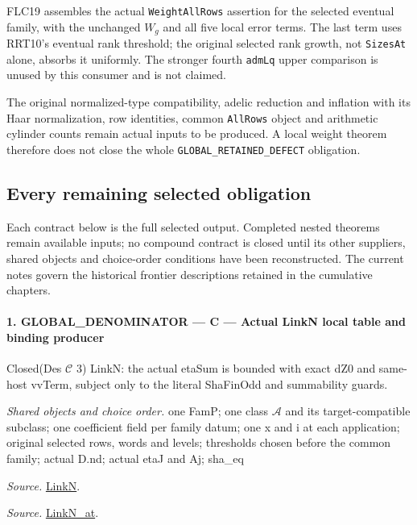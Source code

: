 FLC19 assembles the actual \texttt{Weight\allowbreak All\allowbreak Rows} assertion for the
selected eventual family, with the unchanged $W_g$ and all five local
error terms. The last term uses RRT10's eventual rank threshold;
the original selected rank growth, not \texttt{Sizes\allowbreak At} alone,
absorbs it uniformly. The stronger fourth \texttt{adm\allowbreak Lq} upper
comparison is unused by this consumer and is not claimed.

The original normalized-type compatibility, adelic reduction and
inflation with its Haar normalization, row identities, common
\texttt{All\allowbreak Rows} object and arithmetic cylinder counts remain actual
inputs to be produced. A local weight theorem therefore does not close
the whole \texttt{GLOBAL\_\allowbreak RETAINED\_\allowbreak DEFECT} obligation.

\subsection{Every remaining selected obligation}

Each contract below is the full selected output. Completed nested
theorems remain available inputs; no compound contract is closed until
its other suppliers, shared objects and choice-order conditions have
been reconstructed. The current notes govern the historical frontier
descriptions retained in the cumulative chapters.
\paragraph{1. GLOBAL\_\allowbreak DENOMINATOR — C — Actual LinkN local table and binding producer}

Closed(Des $\mathcal C$ 3) LinkN: the actual etaSum is bounded with exact dZ0 and same-host vvTerm, subject only to the literal ShaFinOdd and summability guards.

\emph{Shared objects and choice order.} one FamP; one class $\mathcal A$ and its target-compatible subclass; one coefficient field per family datum; one x and i at each application; original selected rows, words and levels; thresholds chosen before the common family; actual D.nd; actual etaJ and Aj; sha\_\allowbreak eq

\emph{Source.} \href{https://github.com/CocoSgt/riemann-hypothesis-lean/blob/7cbf7a0c32fca1badf05931879a37c3f8a2b03b4/src/Formalism/SharpRestriction/GlobalTheoremInputs.lean#L45-L48}{LinkN}.

\emph{Source.} \href{https://github.com/CocoSgt/riemann-hypothesis-lean/blob/7cbf7a0c32fca1badf05931879a37c3f8a2b03b4/src/Formalism/SharpRestriction/GlobalTheoremInputs.lean#L40-L44}{LinkN\_\allowbreak at}.

